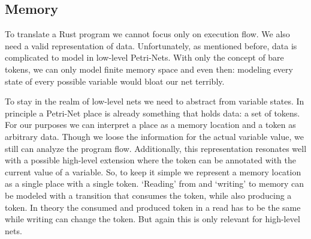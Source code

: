 \subsection{Memory}
To translate a Rust program we cannot focus only on execution flow.
We also need a valid representation of data.
Unfortunately, as mentioned before, data is complicated to model in low-level Petri-Nets.
With only the concept of bare tokens, we can only model finite memory space and even then: modeling every state of every possible variable would bloat our net terribly.

To stay in the realm of low-level nets we need to abstract from variable states.
In principle a Petri-Net place is already something that holds data: a set of tokens.
For our purposes we can interpret a place as a memory location and a token as arbitrary data.
Though we loose the information for the actual variable value, we still can analyze the program flow.
Additionally, this representation resonates well with a possible high-level extension where the token can be annotated with the current value of a variable.
So, to keep it simple we represent a memory location as a single place with a single token.
`Reading' from and `writing' to memory can be modeled with a transition that consumes the token, while also producing a token.
In theory the consumed and produced token in a read has to be the same while writing can change the token.
But again this is only relevant for high-level nets.

